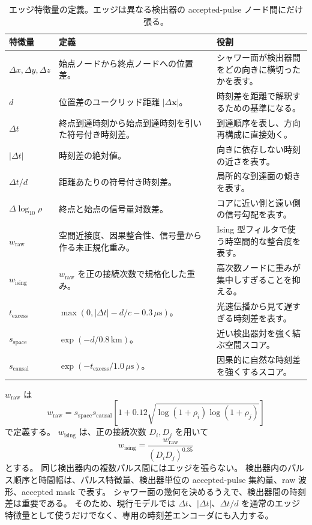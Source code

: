 \documentclass[lualatex,paper=a4,fontsize=9pt]{jlreq}
\begin{document}
\begin{table}[p]
  \centering
  \small
  \caption{エッジ特徴量の定義。エッジは異なる検出器の accepted-pulse ノード間にだけ張る。}
  \label{tab:edge-feature-definitions}
  \begin{tabular}{lll}
    \toprule
    特徴量 & 定義 & 役割 \\
    \midrule
    $\Delta x,\Delta y,\Delta z$ &
    始点ノードから終点ノードへの位置差。 &
    シャワー面が検出器間をどの向きに横切ったかを表す。 \\
    $d$ &
    位置差のユークリッド距離 $|\Delta\mathbf{x}|$。 &
    時刻差を距離で解釈するための基準になる。 \\
    $\Delta t$ &
    終点到達時刻から始点到達時刻を引いた符号付き時刻差。 &
    到達順序を表し、方向再構成に直接効く。 \\
    $|\Delta t|$ &
    時刻差の絶対値。 &
    向きに依存しない時刻の近さを表す。 \\
    $\Delta t/d$ &
    距離あたりの符号付き時刻差。 &
    局所的な到達面の傾きを表す。 \\
    $\Delta\log_{10}\rho$ &
    終点と始点の信号量対数差。 &
    コアに近い側と遠い側の信号勾配を表す。 \\
    $w_{\mathrm{raw}}$ &
    空間近接度、因果整合性、信号量から作る未正規化重み。 &
    Ising 型フィルタで使う時空間的な整合度を表す。 \\
    $w_{\mathrm{ising}}$ &
    $w_{\mathrm{raw}}$ を正の接続次数で規格化した重み。 &
    高次数ノードに重みが集中しすぎることを抑える。 \\
    $t_{\mathrm{excess}}$ &
    $ \max(0,|\Delta t|-d/c-0.3\,\mu\mathrm{s}) $。 &
    光速伝播から見て遅すぎる時刻差を表す。 \\
    $s_{\mathrm{space}}$ &
    $\exp(-d/0.8\,\mathrm{km})$。 &
    近い検出器対を強く結ぶ空間スコア。 \\
    $s_{\mathrm{causal}}$ &
    $\exp(-t_{\mathrm{excess}}/1.0\,\mu\mathrm{s})$。 &
    因果的に自然な時刻差を強くするスコア。 \\
    \bottomrule
  \end{tabular}
\end{table}

$w_{\mathrm{raw}}$ は
\[
  w_{\mathrm{raw}}
  =
  s_{\mathrm{space}}s_{\mathrm{causal}}
  \left[
    1+0.12\sqrt{\log(1+\rho_i)\log(1+\rho_j)}
  \right]
\]
で定義する。
$w_{\mathrm{ising}}$ は、正の接続次数 $D_i,D_j$ を用いて
\[
  w_{\mathrm{ising}} =
  \frac{w_{\mathrm{raw}}}{(D_iD_j)^{0.35}}
\]
とする。
同じ検出器内の複数パルス間にはエッジを張らない。
検出器内のパルス順序と時間幅は、パルス特徴量、検出器単位の accepted-pulse 集約量、raw 波形、accepted mask で表す。
シャワー面の幾何を決めるうえで、検出器間の時刻差は重要である。
そのため、現行モデルでは $\Delta t$、$|\Delta t|$、$\Delta t/d$ を通常のエッジ特徴量として使うだけでなく、専用の時刻差エンコーダにも入力する。
\end{document}
